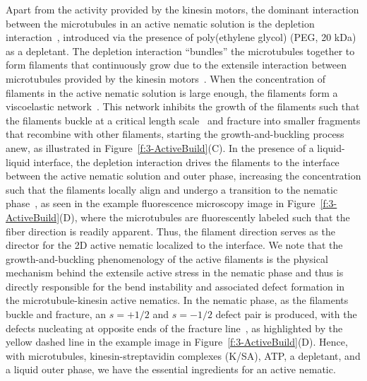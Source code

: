 Apart from the activity provided by the kinesin motors, the dominant interaction between the microtubules in an active nematic solution is the depletion interaction~\cite{RN251}, introduced via the presence of poly(ethylene glycol) (PEG, 20 kDa) as a depletant.
The depletion interaction ``bundles'' the microtubules together to form filaments that continuously grow due to the extensile interaction between microtubules provided by the kinesin motors~\cite{RN244,RN4,RN3}.
When the concentration of filaments in the active nematic solution is large enough, the filaments form a viscoelastic network~\cite{RN253,RN3}.
This network inhibits the growth of the filaments such that the filaments buckle at a critical length scale~\cite{RN253,RN3} and fracture into smaller fragments that recombine with other filaments, starting the growth-and-buckling process anew, as illustrated in Figure~\ref{f:3-ActiveBuild}(C).
In the presence of a liquid-liquid interface, the depletion interaction drives the filaments to the interface between the active nematic solution and outer phase, increasing the concentration such that the filaments locally align and undergo a transition to the nematic phase~\cite{RN3,RN135,RN134}, as seen in the example fluorescence microscopy image in Figure~\ref{f:3-ActiveBuild}(D), where the microtubules are fluorescently labeled such that the fiber direction is readily apparent.
Thus, the filament direction serves as the director for the 2D active nematic localized to the interface.
We note that the growth-and-buckling phenomenology of the active filaments is the physical mechanism behind the extensile active stress in the nematic phase and thus is directly responsible for the bend instability and associated defect formation in the microtubule-kinesin active nematics.
In the nematic phase, as the filaments buckle and fracture, an $s = +1/2$ and $s = -1/2$ defect pair is produced, with the defects nucleating at opposite ends of the fracture line~\cite{RN3,RN11}, as highlighted by the yellow dashed line in the example image in Figure~\ref{f:3-ActiveBuild}(D).
Hence, with microtubules, kinesin-streptavidin complexes (K/SA), ATP, a depletant, and a liquid outer phase, we have the essential ingredients for an active nematic.

